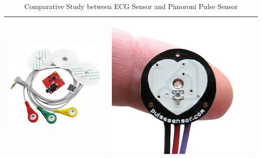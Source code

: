 \begin{table}[p]
\begin{tabularx}{\textwidth}{|X|X|X|}
\includegraphics[width=\linewidth]{images/ecg.png}
& 
\includegraphics[width=\linewidth]{images/s75-0818p01wj.jpg}
\\ \hline

\end{tabularx}
\caption{Comparative Study between ECG Sensor and Pimoroni Pulse Sensor}
\label{table:heart-rate-sensor}
\end{table}

